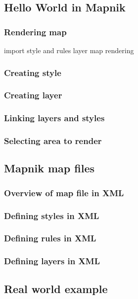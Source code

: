 \documentclass{beamer}
\begin{document}
\subsection{Hello World in Mapnik}

\begin{frame}
  \frametitle{Rendering map}
import
style and rules
layer
map
rendering
\end{frame}

\begin{frame}
  \frametitle{Creating style}

\end{frame}

\begin{frame}
  \frametitle{Creating layer}

\end{frame}

\begin{frame}
  \frametitle{Linking layers and styles}

\end{frame}

\begin{frame}
  \frametitle{Selecting area to render}

\end{frame}

\subsection{Mapnik map files}

\begin{frame}
  \frametitle{Overview of map file in XML}

\end{frame}

\begin{frame}
  \frametitle{Defining styles in XML}

\end{frame}

\begin{frame}
  \frametitle{Defining rules in XML}

\end{frame}

\begin{frame}
  \frametitle{Defining layers in XML}

\end{frame}

\subsection{Real world example}
\end{document}
